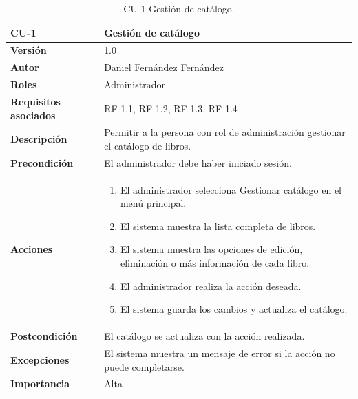 \begin{table}[p]
        \centering
        \begin{tabularx}{\linewidth}{ p{} p{} }
            \toprule
            \textbf{CU-1} & \textbf{Gestión de catálogo}\\
            \toprule
            \textbf{Versión} & 1.0 \\
            \textbf{Autor} & Daniel Fernández Fernández \\
            \textbf{Roles} & Administrador \\
            \textbf{Requisitos asociados} & RF-1.1, RF-1.2, RF-1.3, RF-1.4 \\
            \textbf{Descripción} & Permitir a la persona con rol de administración gestionar el catálogo de libros. \\
            \textbf{Precondición} & El administrador debe haber iniciado sesión. \\
            \textbf{Acciones} &
            \begin{enumerate}
            \def\labelenumi{\arabic{enumi}.}
            \tightlist
            \item El administrador selecciona Gestionar catálogo en el menú principal.
            \item El sistema muestra la lista completa de libros.
            \item El sistema muestra las opciones de edición, eliminación o más información de cada libro.
            \item El administrador realiza la acción deseada.
            \item El sistema guarda los cambios y actualiza el catálogo.
            \end{enumerate}\\
            \textbf{Postcondición} & El catálogo se actualiza con la acción realizada. \\
            \textbf{Excepciones} & El sistema muestra un mensaje de error si la acción no puede completarse. \\
            \textbf{Importancia} & Alta \\
            \bottomrule
        \end{tabularx}
        \caption{CU-1 Gestión de catálogo.}
\end{table}


